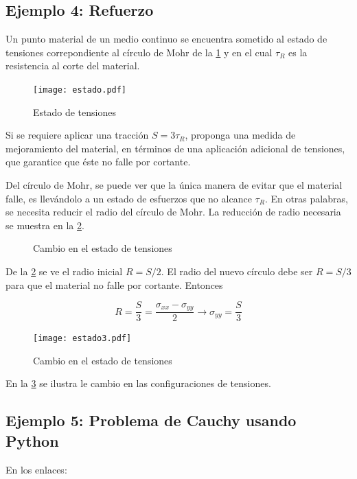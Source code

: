 \documentclass[../notas medios.tex]{subfiles}
\begin{document}
\subsection*{Ejemplo 4: Refuerzo}

Un punto material de un medio continuo se encuentra sometido al estado de tensiones correpondiente al círculo de Mohr de la \cref{estado} y en el cual  $\tau_R$ es la resistencia al corte del material.

\begin{figure}[h]
	\centering
	\texttt{[image: estado.pdf]} 
	\caption{Estado de tensiones}
	\label{estado}
\end{figure}

Si se requiere aplicar una tracción $S = 3\tau_R$,  proponga una medida de mejoramiento del material, en términos de una aplicación adicional de tensiones, que garantice que éste no falle por cortante.

Del círculo de Mohr, se puede ver que la única manera de evitar que el material falle, es llevándolo a un estado de esfuerzos que no alcance $\tau_R$. En otras palabras, se necesita reducir el radio del círculo de Mohr. La reducción de radio necesaria se muestra en la \cref{modif}. 


\begin{figure}[H]
	\centering
	\caption{Cambio en el estado de tensiones}
	\label{modif}
\end{figure}

De la \cref{modif} se ve el radio inicial $R=S/2$. El radio del nuevo círculo debe ser $R=S/3$ para que el material no falle por cortante. Entonces


\begin{equation*}
R = \frac{S}{3} =  \frac{\sigma_{xx} - \sigma_{yy}}{2} \rightarrow
\sigma_{yy} = \frac{S}{3}
\end{equation*}

\begin{figure}[h]
	\centering
	\texttt{[image: estado3.pdf]} 
	\caption{Cambio en el estado de tensiones}
	\label{estado3}
\end{figure}

En la \cref{estado3} se ilustra le cambio en las configuraciones de tensiones.




\subsection*{Ejemplo 5: Problema de Cauchy usando Python}
En los enlaces:
\end{document}
